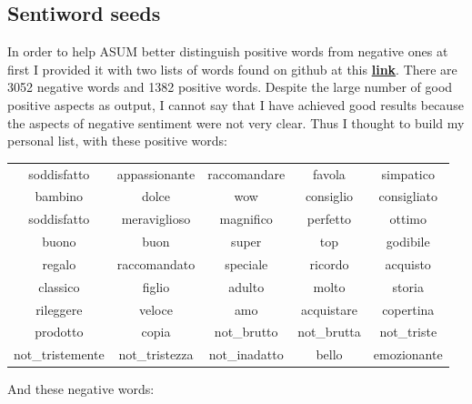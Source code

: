 \documentclass[a4paper,12pt]{article}
\begin{document}
\subsection{Sentiword seeds}
In order to help ASUM better distinguish positive words from negative ones at first I provided it with two lists of words found on github at this \href{https://github.com/gragusa/sentiment-lang-italian}{\textbf{link}}. There are 3052 negative words and 1382 positive words. Despite the large number of good positive aspects as output, I cannot say that I have achieved good results because the aspects of negative sentiment were not very clear. 
Thus I thought to build my personal list, with these positive words:\\
\begin{center}
	\begin{tabular}{ |c c c c c| } 
		\hline
		soddisfatto & appassionante & raccomandare & favola & simpatico\\ 
		bambino & dolce & wow & consiglio & consigliato\\ 
		soddisfatto & meraviglioso & magnifico & perfetto & ottimo\\ 
		buono & buon & super & top & godibile\\ 
		regalo & raccomandato & speciale & ricordo & acquisto\\ 
		classico & figlio & adulto & molto & storia\\ 
		rileggere & veloce & amo & acquistare & copertina\\ 
		prodotto & copia & not\_brutto & not\_brutta & not\_triste\\ 
		not\_tristemente & not\_tristezza & not\_inadatto & bello & emozionante\\ 
		\hline
	\end{tabular}
\end{center}
\newpage
\noindent And these negative words:
\end{document}
